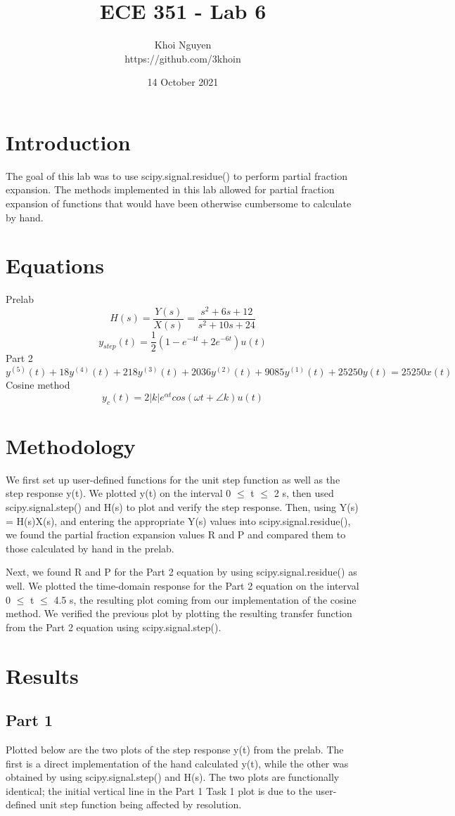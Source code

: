 \documentclass[11pt,a4,titlepage]{article}
\title{ECE 351 - Lab 6}
\author{Khoi Nguyen \\ https://github.com/3khoin}
\date{14 October 2021}
\begin{document}
\maketitle
\pagebreak

\tableofcontents
\pagebreak

\section{Introduction}
The goal of this lab was to use scipy.signal.residue() to perform partial fraction expansion. The methods implemented in this lab allowed for partial fraction expansion of functions that would have been otherwise cumbersome to calculate by hand.

\section{Equations}
Prelab
\[H(s) = \frac{Y(s)}{X(s)} = \frac{s^{2} + 6s + 12}{s^{2} + 10s + 24}\]
\[y_{step}(t) = \frac{1}{2}(1 - e^{-4t} + 2e^{-6t})u(t)\]
Part 2
\[y^{(5)}(t) + 18y^{(4)}(t) + 218y^{(3)}(t) + 2036y^{(2)}(t) + 9085y^{(1)}(t) + 25250y(t) = 25250x(t)\]
Cosine method
\[y_{c}(t) = 2|k|e^{\alpha t}cos(\omega t + \angle k)u(t)\]

\section{Methodology}
We first set up user-defined functions for the unit step function as well as the step response y(t). We plotted y(t) on the interval 0 $\leq$ t $\leq$ 2 s, then used scipy.signal.step() and H(s) to plot and verify the step response. Then, using Y(s) = H(s)X(s), and entering the appropriate Y(s) values into scipy.signal.residue(), we found the partial fraction expansion values R and P and compared them to those calculated by hand in the prelab.

Next, we found R and P for the Part 2 equation by using scipy.signal.residue() as well. We plotted the time-domain response for the Part 2 equation on the interval 0 $\leq$ t $\leq$ 4.5 s, the resulting plot coming from our implementation of the cosine method. We verified the previous plot by plotting the resulting transfer function from the Part 2 equation using scipy.signal.step().

\section{Results}
\subsection{Part 1}
Plotted below are the two plots of the step response y(t) from the prelab. The first is a direct implementation of the hand calculated y(t), while the other was obtained by using scipy.signal.step() and H(s). The two plots are functionally identical; the initial vertical line in the Part 1 Task 1 plot is due to the user-defined unit step function being affected by resolution.
\end{document}
